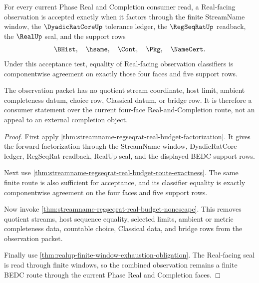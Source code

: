 \begin{theorem}
\label{thm:streamname-real-seal-observation-factorization}
For every current Phase Real and Completion consumer read, a Real-facing observation is accepted exactly when it factors through the finite StreamName window, the $\DyadicRatCoreUp$ tolerance ledger, the $\RegSeqRatUp$ readback, the $\RealUp$ seal, and the support rows
$$
\BHist,\quad \hsame,\quad \Cont,\quad \Pkg,\quad \NameCert.
$$
Under this acceptance test, equality of Real-facing observation classifiers is componentwise agreement on exactly those four faces and five support rows.

The observation packet has no quotient stream coordinate, host limit, ambient completeness datum, choice row, Classical datum, or bridge row. It is therefore a consumer statement over the current four-face Real-and-Completion route, not an appeal to an external completion object.
\end{theorem}
\begin{proof}
First apply \autoref{thm:streamname-regseqrat-real-budget-factorization}. It gives the forward factorization through the StreamName window, DyadicRatCore ledger, RegSeqRat readback, RealUp seal, and the displayed BEDC support rows.

Next use \autoref{thm:streamname-regseqrat-real-budget-route-exactness}. The same finite route is also sufficient for acceptance, and its classifier equality is exactly componentwise agreement on the four faces and five support rows.

Now invoke \autoref{thm:streamname-regseqrat-real-budget-nonescape}. This removes quotient streams, host sequence equality, selected limits, ambient or metric completeness data, countable choice, Classical data, and bridge rows from the observation packet.

Finally use \autoref{thm:realup-finite-window-exhaustion-obligation}. The Real-facing seal is read through finite windows, so the combined observation remains a finite BEDC route through the current Phase Real and Completion faces.
\end{proof}


